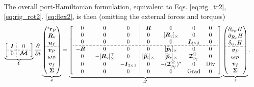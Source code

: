 \documentclass{svjour3}                     %
\DeclareMathOperator*{\Grad}{Grad}
\DeclareMathOperator*{\Div}{Div}
\newcommand{\crmat}[1]{\ensuremath{[#1]_{\times}}}
\begin{document}
The overall port-Hamiltonian formulation, equivalent to Eqs. \eqref{eq:rig_tr2}, \eqref{eq:rig_rot2}, \eqref{eq:flex2}, is then (omitting the external forces and torques)
\begin{equation}
\label{eq:ph_mfd_all}
\setlength{\dashlinegap}{2pt}
\underbrace{
	{\left[ \begin{array}{c:c}
		\bm{I} & 0 \\
		\hdashline
		0 & \bm{\mathcal{M}} \\
		\end{array} \right]}
}_{\bm{\mathcal{E}}}
\diffp{}{t}
\underbrace{
	\begin{pmatrix}
	^i \bm{r}_P \\ \bm{R}_{\text{v}} \\ \bm{u}_f \\\hdashline  \bm{v}_P \\ \bm\omega_P  \\ \bm{v}_f  \\ \bm\Sigma \\
	\end{pmatrix}
}_{\bm{e}} = 
\underbrace{
	{\left[ \begin{array}{ccc:cccc}
		0 & 0 & 0 &  \bm{R} & 0 & 0 & 0 \\
		0 & 0 & 0 & 0 & \crmat{\bm{R}_{\text{v}}} & 0 & 0 \\
		0 & 0 & 0 & 0 & 0 & \bm{I}_{3\times 3} & 0  \\ 
		\hdashline
		-\bm{R}^\top & 0 & 0 & 0 & \crmat{\widetilde{\bm{p}}_t} & 0 & 0 \\
		0 & -\crmat{\bm{R}_{\text{v}}}^\top & 0 & \crmat{\widetilde{\bm{p}}_t} & \crmat{\widetilde{\bm{p}}_r} & \bm{\mathcal{I}}_{p_f}^\Omega & 0 \\
		0 & 0 & -\bm{I}_{3\times 3} & 0 & -(\bm{\mathcal{I}}_{p_f}^\Omega)^* & 0 & \Div \\
		0 & 0 & 0 & 0 & 0 & \Grad & 0 \\
		\end{array} \right]}
}_{\bm{\mathcal{J}}}
\underbrace{\begin{pmatrix}
	\partial_{\bm{r}_P}H \\ \partial_{\bm{R}_\text{v}}H \\ \delta_{\bm{u}_f} H \\\hdashline  \bm{v}_P \\ \bm\omega_P  \\ \bm{v}_f  \\ \bm\Sigma \\
	\end{pmatrix}}_{\bm{z}}.
\end{equation} 
\end{document}
